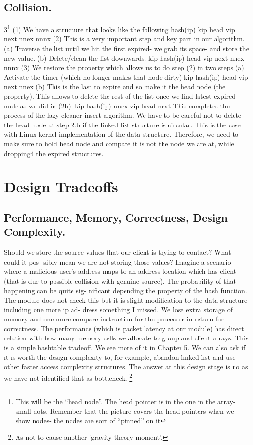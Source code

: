 \subsection{Collision.}
3\footnote{This will be the “head node”. The head pointer is in the one in the array- small dots. Remember
that the picture covers the head pointers when we show nodes- the nodes are sort of “pinned” on
it}
(1) We have a structure that looks like the following
hash(ip)
kip
head
vip
next
nnex
nnnx
(2) This is a very important step and key part in our algorithm.
(a) Traverse the list until we hit the first expired- we grab its space- and
store the new value.
(b) Delete/clean the list downwards.
kip
hash(ip)
head
vip
next
nnex
nnnx
(3) We restore the property which allows us to do step (2) in two steps
(a) Activate the timer (which no longer makes that node dirty)
kip
hash(ip)
head
vip
next
nnex
(b) This is the last to expire and so make it the head node (the property).
This allows to delete the rest of the list once we find latest expired
node as we did in (2b).
kip
hash(ip)
nnex
vip
head
next
This completes the process of the lazy cleaner insert algorithm.
We have to be careful not to delete the head node at step 2.b if the linked list
structure is circular. This is the case with Linux kernel implementation of the data
structure. Therefore, we need to make sure to hold head node and compare it is
not the node we are at, while dropping4 the expired structures.
\section{Design Tradeoffs}
\subsection{Performance, Memory, Correctness, Design Complexity.} Should
we store the source values that our client is trying to contact? What could it pos-
sibly mean we are not storing those values? Imagine a scenario where a malicious
user’s address maps to an address location which has client (that is due to possible
collision with genuine source). The probability of that happening can be quite sig-
nificant depending the property of the hash function. The module does not check
this but it is slight modification to the data structure including one more ip ad-
dress something I missed. We lose extra storage of memory and one more compare
instruction for the processor in return for correctness.
The performance (which is packet latency at our module) has direct relation
with how many memory cells we allocate to group and client arrays. This is a
simple hashtable tradeoff. We see more of it in Chapter 5.
We can also ask if it is worth the design complexity to, for example, abandon
linked list and use other faster access complexity structures. The answer at this
design stage is no as we have not identified that as bottleneck.
\footnote{As not to cause another ’gravity theory moment’.}

